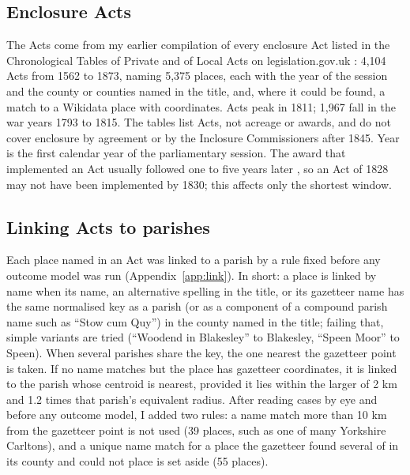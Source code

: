 \documentclass[11pt,a4paper]{article}
\begin{document}
\subsection{Enclosure Acts}
The Acts come from my earlier compilation of every enclosure Act listed in the Chronological Tables of Private and of Local Acts on legislation.gov.uk \citep{hotham2026enclosure}: 4,104 Acts from 1562 to 1873, naming 5,375 places, each with the year of the session and the county or counties named in the title, and, where it could be found, a match to a Wikidata place with coordinates. Acts peak in 1811; 1,967 fall in the war years 1793 to 1815. The tables list Acts, not acreage or awards, and do not cover enclosure by agreement or by the Inclosure Commissioners after 1845. Year is the first calendar year of the parliamentary session. The award that implemented an Act usually followed one to five years later \citep{turner1980}, so an Act of 1828 may not have been implemented by 1830; this affects only the shortest window.

\subsection{Linking Acts to parishes}
Each place named in an Act was linked to a parish by a rule fixed before any outcome model was run (Appendix~\ref{app:link}). In short: a place is linked by name when its name, an alternative spelling in the title, or its gazetteer name has the same normalised key as a parish (or as a component of a compound parish name such as ``Stow cum Quy'') in the county named in the title; failing that, simple variants are tried (``Woodend in Blakesley'' to Blakesley, ``Speen Moor'' to Speen). When several parishes share the key, the one nearest the gazetteer point is taken. If no name matches but the place has gazetteer coordinates, it is linked to the parish whose centroid is nearest, provided it lies within the larger of 2 km and 1.2 times that parish's equivalent radius. After reading cases by eye and before any outcome model, I added two rules: a name match more than 10 km from the gazetteer point is not used (39 places, such as one of many Yorkshire Carltons), and a unique name match for a place the gazetteer found several of in its county and could not place is set aside (55 places).
\end{document}
